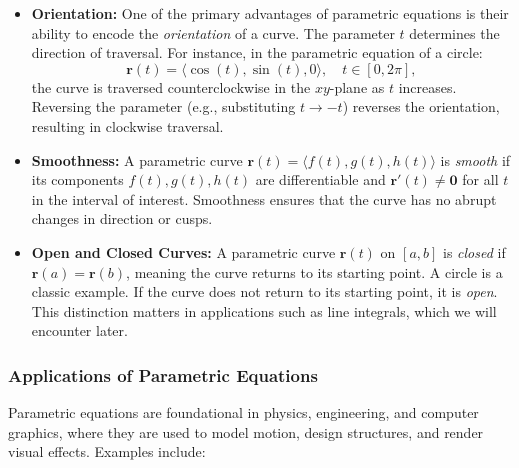 \begin{itemize}
    \item \textbf{Orientation:} 
    One of the primary advantages of parametric equations is their ability to encode the \textit{orientation} of a curve. The parameter \( t \) determines the direction of traversal. For instance, in the parametric equation of a circle:
    \[
    \mathbf{r}(t) = \langle \cos(t), \sin(t), 0 \rangle, \quad t \in [0, 2\pi],
    \]
    the curve is traversed counterclockwise in the \( xy \)-plane as \( t \) increases. Reversing the parameter (e.g., substituting \( t \to -t \)) reverses the orientation, resulting in clockwise traversal.

    \item \textbf{Smoothness:} 
    A parametric curve \( \mathbf{r}(t) = \langle f(t), g(t), h(t) \rangle \) is \textit{smooth} if its components \( f(t), g(t), h(t) \) are differentiable and \( \mathbf{r}'(t) \neq \mathbf{0} \) for all \( t \) in the interval of interest. Smoothness ensures that the curve has no abrupt changes in direction or cusps.

    \item \textbf{Open and Closed Curves:}
    A parametric curve \( \mathbf{r}(t) \) on \( [a, b] \) is \textit{closed} if \( \mathbf{r}(a) = \mathbf{r}(b) \), meaning the curve returns to its starting point. A circle is a classic example. If the curve does not return to its starting point, it is \textit{open}. This distinction matters in applications such as line integrals, which we will encounter later.
\end{itemize}



\subsubsection*{Applications of Parametric Equations}

\noindent Parametric equations are foundational in physics, engineering, and computer graphics, where they are used to model motion, design structures, and render visual effects. Examples include:

